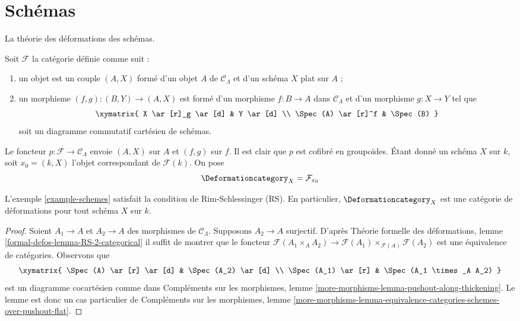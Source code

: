 \section{Schémas}
\label{section-schemes}

\noindent
La théorie des déformations des schémas.

\begin{example}[Schémas]
\label{example-schemes}
Soit $\mathcal{F}$ la catégorie définie comme suit :
\begin{enumerate}
\item un objet est un couple $(A, X)$ formé d'un
objet $A$ de $\mathcal{C}_\Lambda$ et d'un schéma $X$ plat sur $A$ ;
\item un morphisme $(f, g) : (B, Y) \to (A, X)$ est formé d'un
morphisme $f : B \to A$ dans $\mathcal{C}_\Lambda$ et
d'un morphisme $g : X \to Y$ tel que
$$
\xymatrix{
X \ar[r]_g \ar[d] & Y \ar[d] \\
\Spec(A) \ar[r]^f & \Spec(B)
}
$$
soit un diagramme commutatif cartésien de schémas.
\end{enumerate}
Le foncteur $p : \mathcal{F} \to \mathcal{C}_\Lambda$ envoie $(A, X)$
sur $A$ et $(f, g)$ sur $f$. Il est clair que $p$ est cofibré en groupoïdes.
Étant donné un schéma $X$ sur $k$, soit $x_0 = (k, X)$ l'objet correspondant
de $\mathcal{F}(k)$. On pose
$$
\Deformationcategory_X = \mathcal{F}_{x_0}
$$
\end{example}

\begin{lemma}
\label{lemma-schemes-RS}
L'exemple \ref{example-schemes}
satisfait la condition de Rim-Schlessinger (RS).
En particulier, $\Deformationcategory_X$ est une catégorie de déformations
pour tout schéma $X$ sur $k$.
\end{lemma}

\begin{proof}
Soient $A_1 \to A$ et $A_2 \to A$ des morphismes de $\mathcal{C}_\Lambda$.
Supposons $A_2 \to A$ surjectif. D'après Théorie formelle
des déformations, lemme
\ref{formal-defos-lemma-RS-2-categorical}
il suffit de montrer que le foncteur
$\mathcal{F}(A_1 \times_A A_2) \to
\mathcal{F}(A_1) \times_{\mathcal{F}(A)} \mathcal{F}(A_2)$
est une équivalence de catégories.
Observons que
$$
\xymatrix{
\Spec(A) \ar[r] \ar[d] & \Spec(A_2) \ar[d] \\
\Spec(A_1) \ar[r] &
\Spec(A_1 \times_A A_2)
}
$$
est un diagramme cocartésien comme dans Compléments sur les morphismes, lemme
\ref{more-morphisms-lemma-pushout-along-thickening}.
Le lemme est donc un cas particulier de Compléments sur les morphismes, lemme
\ref{more-morphisms-lemma-equivalence-categories-schemes-over-pushout-flat}.
\end{proof}

